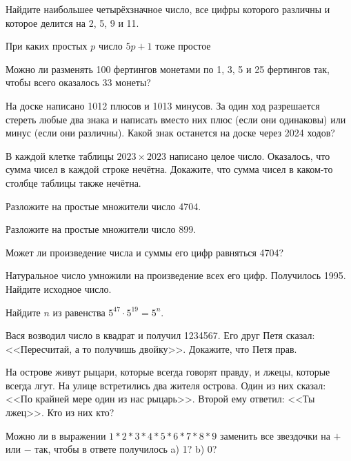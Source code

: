 \documentclass{article}
\begin{document}
\begin{enumerate_boxed}
        \item Найдите наибольшее четырёхзначное число, все цифры которого различны и которое делится на 2, 5, 9 и 11.

        \item При каких простых $p$ число $5p + 1$ тоже простое

        \item Можно ли разменять 100 фертингов монетами по 1, 3, 5 и 25 фертингов так, чтобы всего оказалось 33 монеты?

        \item На доске написано 1012 плюсов и 1013 минусов.
        За один ход разрешается стереть любые два знака и написать вместо них плюс (если они одинаковы) или минус (если они различны).
        Какой знак останется на доске через 2024 ходов?

        \item В каждой клетке таблицы $2023\times2023$ написано целое число.
        Оказалось, что сумма чисел в каждой строке нечётна.
        Докажите, что сумма чисел в каком-то столбце таблицы также нечётна.

        \item Разложите на простые множители число 4704.

        \item Разложите на простые множители число 899.

        \item Может ли произведение числа и суммы его цифр равняться 4704?

        \item Натуральное число умножили на произведение всех его цифр.
        Получилось 1995.
        Найдите исходное число.

        \item Найдите $n$ из равенства $5^{47} \cdot 5^{19} = 5^n$.

        \item Вася возводил число в квадрат и получил 1234567.
        Его друг Петя сказал: <<Пересчитай, а то получишь двойку>>.
        Докажите, что Петя прав.

        \item На острове живут рыцари, которые всегда говорят правду, и лжецы, которые всегда лгут.
        На улице встретились два жителя острова.
        Один из них сказал: <<По крайней мере один из нас рыцарь>>.
        Второй ему ответил: <<Ты лжец>>.
        Кто из них кто?

        \item Можно ли в выражении $1 * 2 * 3*4*5*6*7*8*9$ заменить все звездочки на $+$ или $-$ так, чтобы в ответе получилось
        a) 1?
        b) 0?


\end{enumerate_boxed}
\end{document}

